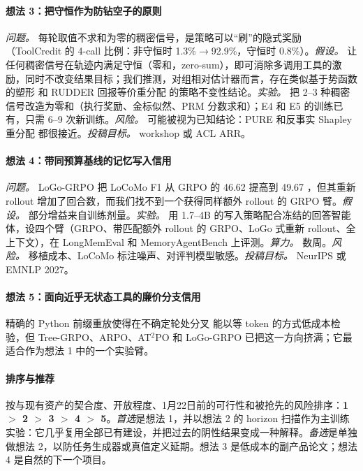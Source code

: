 \paragraph{想法 3：把守恒作为防钻空子的原则}
\emph{问题。} 每轮取值不求和为零的稠密信号，是策略可以“刷”的隐式奖励（ToolCredit 的 4-call 比例：非守恒时 1.3\%$\to$92.9\%，守恒时 0.8\%）。\emph{假设。} 让任何稠密信号在轨迹内满足守恒（零和，zero-sum），即可消除多调用工具的激励，同时不改变结果目标；我们推测，对组相对估计器而言，存在类似基于势函数的塑形 \citep{ng1999policy} 和 RUDDER 回报等价重分配 \citep{arjonamedina2019rudder} 的策略不变性结论。\emph{实验。} 把 2--3 种稠密信号改造为零和（执行奖励、金标似然、PRM 分数求和）；E4 和 E5 的训练已有，只需 6--9 次新训练。\emph{风险。} 可能被视为已知结论：PURE \citep{cheng2025stop} 和反事实 Shapley 重分配 \citep{li2026counterfactual} 都很接近。\emph{投稿目标。} workshop 或 ACL ARR。

\paragraph{想法 4：带同预算基线的记忆写入信用}
\emph{问题。} LoGo-GRPO 把 LoCoMo F1 从 GRPO 的 46.62 提高到 49.67 \citep{yan2026memory}，但其重新 rollout 增加了回合数，而我们找不到一个获得同样额外 rollout 的 GRPO 臂。\emph{假设。} 部分增益来自训练剂量。\emph{实验。} 用 1.7--4B 的写入策略配合冻结的回答智能体，设四个臂（GRPO、带匹配额外 rollout 的 GRPO、LoGo 式重新 rollout、全上下文），在 LongMemEval \citep{wu2024longmemeval} 和 MemoryAgentBench \citep{hu2025evaluating} 上评测。\emph{算力。} 数周。\emph{风险。} 移植成本、LoCoMo 标注噪声\unverified、对评判模型敏感。\emph{投稿目标。} NeurIPS 或 EMNLP 2027。

\paragraph{想法 5：面向近乎无状态工具的廉价分支信用}
精确的 Python 前缀重放使得在不确定轮处分叉 \citep{ji2025tree} 能以等 token 的方式低成本检验，但 Tree-GRPO、ARPO、AT$^2$PO 和 LoGo-GRPO 已把这一方向挤满；它最适合作为想法 1 中的一个实验臂。

\paragraph{排序与推荐}
按与现有资产的契合度、开放程度、1月22日前的可行性和被抢先的风险排序：\textbf{1 $>$ 2 $>$ 3 $>$ 4 $>$ 5}。\emph{首选}是想法 1，并以想法 2 的 horizon 扫描作为主训练实验：它几乎复用全部已有建设，并把过去的阴性结果变成一种解释。\emph{备选}是单独做想法 2，以防任务生成器或真值定义延期。想法 3 是低成本的副产品论文；想法 4 是自然的下一个项目。


